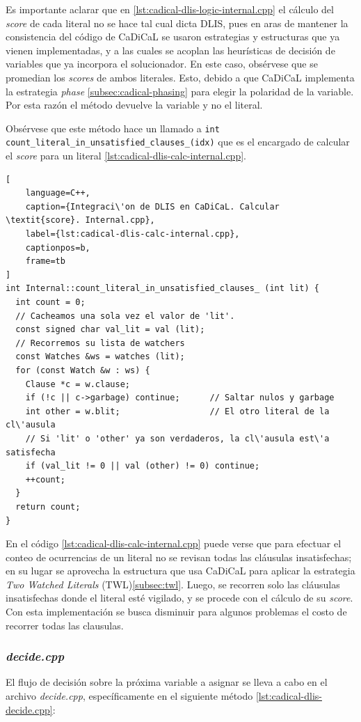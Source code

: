 Es importante aclarar que en \ref{lst:cadical-dlis-logic-internal.cpp} el c\'alculo del \textit{score} de cada literal no se hace tal cual dicta DLIS, pues en aras de mantener la consistencia del c\'odigo de CaDiCaL se usaron estrategias y estructuras que ya vienen implementadas, y a las cuales se acoplan las heur\'isticas de decisi\'on de variables que ya incorpora el solucionador. En este caso, obs\'ervese que se promedian los \textit{scores} de ambos literales. Esto, debido a que CaDiCaL implementa la estrategia \textit{phase} \ref{subsec:cadical-phasing} para elegir la polaridad de la variable. Por esta raz\'on el m\'etodo devuelve la variable y no el literal.

Obs\'ervese que este m\'etodo hace un llamado a \texttt{int count\_literal\_in\_unsatisfied\_clauses\_(idx)} que es el encargado de calcular el \textit{score} para un literal \ref{lst:cadical-dlis-calc-internal.cpp}.

\begin{lstlisting}[
    language=C++,
    caption={Integraci\'on de DLIS en CaDiCaL. Calcular \textit{score}. Internal.cpp},
    label={lst:cadical-dlis-calc-internal.cpp},
    captionpos=b,
    frame=tb
]
int Internal::count_literal_in_unsatisfied_clauses_ (int lit) {
  int count = 0;
  // Cacheamos una sola vez el valor de 'lit'.
  const signed char val_lit = val (lit);
  // Recorremos su lista de watchers
  const Watches &ws = watches (lit);
  for (const Watch &w : ws) {
    Clause *c = w.clause;                
    if (!c || c->garbage) continue;      // Saltar nulos y garbage
    int other = w.blit;                  // El otro literal de la cl\'ausula
    // Si 'lit' o 'other' ya son verdaderos, la cl\'ausula est\'a satisfecha
    if (val_lit != 0 || val (other) != 0) continue;
    ++count;
  }
  return count;
}

\end{lstlisting}

En el c\'odigo \ref{lst:cadical-dlis-calc-internal.cpp} puede verse que para efectuar el conteo de ocurrencias de un literal no se revisan todas las cl\'ausulas insatisfechas; en su lugar se aprovecha la estructura que usa CaDiCaL para aplicar la estrategia \textit{Two Watched Literals} (TWL)\ref{subsec:twl}. Luego, se recorren solo las cl\'ausulas insatisfechas donde el literal est\'e vigilado, y se procede con el c\'alculo de su \textit{score}. Con esta implementaci\'on se busca disminuir para algunos problemas el costo de recorrer todas las clausulas.

\subsubsection{\textit{decide.cpp}}
El flujo de decisi\'on sobre la pr\'oxima variable a asignar se lleva a cabo en el archivo \textit{decide.cpp}, espec\'ificamente en el siguiente m\'etodo \ref{lst:cadical-dlis-decide.cpp}:


